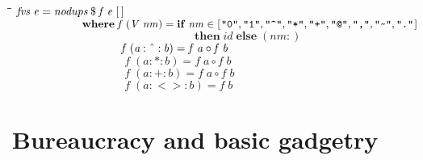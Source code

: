 \documentclass{article}
\newlength{\lwidth}\setlength{\lwidth}{4.5cm}
\newlength{\cwidth}\setlength{\cwidth}{8mm} %
\newcommand{\Conid}[1]{\mathit{#1}}
\newcommand{\Varid}[1]{\mathit{#1}}
\begin{document}
\begin{tabbing}
\qquad\=\hspace{\lwidth}\=\hspace{\cwidth}\=\+\kill
${\Varid{fvs}\;\Varid{e}\mathrel{=}\Varid{nodups}\mathbin{\$}\Varid{f}\;\Varid{e}\;[\mskip1.5mu \mskip1.5mu]}$\\
${\phantom{\Varid{fvs}\;\Varid{e}\mathrel{=}\Varid{nodups}\mbox{}}\mathbf{where}\;\Varid{f}\;(\Conid{V}\;\Varid{nm})\mathrel{=}\mathbf{if}\;\Varid{nm}\in [\mskip1.5mu \text{\ttfamily \char34 0\char34},\text{\ttfamily \char34 1\char34},\text{\ttfamily \char34 \char94 \char34},\text{\ttfamily \char34 *\char34},\text{\ttfamily \char34 +\char34},\text{\ttfamily \char34 @\char34},\text{\ttfamily \char34 ,\char34},\text{\ttfamily \char34 \char126 \char34},\text{\ttfamily \char34 .\char34}\mskip1.5mu]}$\\
${\phantom{\Varid{fvs}\;\Varid{e}\mathrel{=}\Varid{nodups}\mbox{}}\phantom{\mathbf{where}\;\Varid{f}\;(\Conid{V}\;\Varid{nm})\mathrel{=}\mbox{}}\mathbf{then}\;\Varid{id}\;\mathbf{else}\;(\Varid{nm}\mathbin{:})}$\\
${\phantom{\Varid{fvs}\;\Varid{e}\mathrel{=}\Varid{nodups}\mbox{}}\phantom{\mathbf{where}\;\mbox{}}\Varid{f}\;(\Varid{a}\mathbin{:\char94 :}\Varid{b})\mathrel{=}\Varid{f}\;\Varid{a}\mathbin{\circ}\Varid{f}\;\Varid{b}}$\\
${\phantom{\Varid{fvs}\;\Varid{e}\mathrel{=}\Varid{nodups}\mbox{}}\phantom{\mathbf{where}\;\mbox{}}\Varid{f}\;(\Varid{a}\mathbin{:*:}\Varid{b})\mathrel{=}\Varid{f}\;\Varid{a}\mathbin{\circ}\Varid{f}\;\Varid{b}}$\\
${\phantom{\Varid{fvs}\;\Varid{e}\mathrel{=}\Varid{nodups}\mbox{}}\phantom{\mathbf{where}\;\mbox{}}\Varid{f}\;(\Varid{a}\mathbin{:+:}\Varid{b})\mathrel{=}\Varid{f}\;\Varid{a}\mathbin{\circ}\Varid{f}\;\Varid{b}}$\\
${\phantom{\Varid{fvs}\;\Varid{e}\mathrel{=}\Varid{nodups}\mbox{}}\phantom{\mathbf{where}\;\mbox{}}\Varid{f}\;(\Varid{a}\mathbin{:<>:}\Varid{b})\mathrel{=}\Varid{f}\;\Varid{b}}$
\end{tabbing}


\appendix

\section{Bureaucracy and basic gadgetry}
\end{document}
